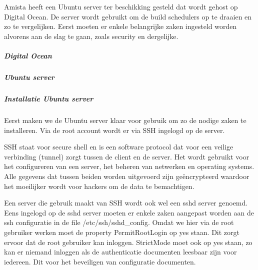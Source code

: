 
\chapter{}
\label{ch:voorbeeldapplicatie}
Amista heeft een Ubuntu server ter beschikking gesteld dat wordt gehost op Digital Ocean. De server wordt gebruikt om de build schedulers op te draaien en zo te vergelijken. Eerst moeten er enkele belangrijke zaken ingesteld worden alvorens aan de slag te gaan, zoals security en dergelijke.

    \paragraph{Digital Ocean}
    
    \paragraph{Ubuntu server}
    
    \paragraph{Installatie Ubuntu server}
    Eerst maken we de Ubuntu server klaar voor gebruik om zo de nodige zaken te installeren.
    Via de root account wordt er via SSH ingelogd op de server. 
    
    SSH staat voor secure shell en is een software protocol dat voor een veilige verbinding (tunnel) zorgt tussen de client en de server. Het wordt gebruikt voor het configureren van een server, het beheren van netwerken en operating systems. Alle gegevens dat tussen beiden worden uitgevoerd zijn geëncrypteerd waardoor het moeilijker wordt voor hackers om de data te bemachtigen.
    
    Een server die gebruik maakt van SSH wordt ook wel een sshd server genoemd. Eens ingelogd op de sshd server moeten er enkele zaken aangepast worden aan de ssh configuratie in de file /etc/ssh/sshd\_config. Omdat we hier via de root gebruiker werken moet de property PermitRootLogin op yes staan. Dit zorgt ervoor dat de root gebruiker kan inloggen.
    StrictMode moet ook op yes staan, zo kan er niemand inloggen als de authenticatie documenten leesbaar zijn voor iedereen. Dit voor het beveiligen van configuratie documenten. %
    
